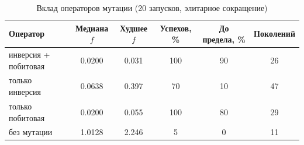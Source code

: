 \begin{table}[H]
\caption{Вклад операторов мутации (20 запусков, элитарное сокращение)}
\label{tab:mutation}
\centering
\small
\begin{tabular}{lccccc}
\toprule
Оператор & Медиана $f$ & Худшее $f$ & Успехов, \% & До предела, \% & Поколений \\
\midrule
инверсия + побитовая & 0.0200 & 0.031 & 100 & 90 & 26 \\
только инверсия & 0.0638 & 0.397 & 70 & 10 & 47 \\
только побитовая & 0.0200 & 0.055 & 100 & 80 & 29 \\
без мутации & 1.0128 & 2.246 & 5 & 0 & 11 \\
\bottomrule
\end{tabular}
\end{table}
